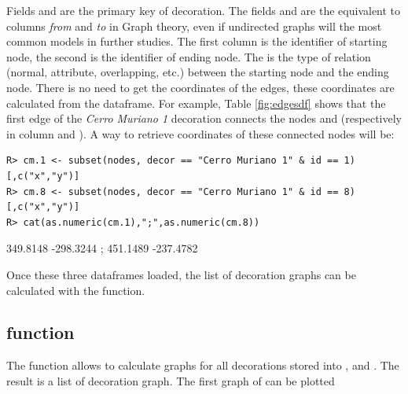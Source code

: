 \documentclass[article]{jss}\usepackage{knitr}
\begin{document}
Fields  and  are the primary key of decoration. The fields  and  are the equivalent to columns \emph{from} and \emph{to} in Graph theory, even if undirected graphs will the most common models in further studies. The first column is the identifier of starting node, the second is the identifier of ending node. The  is the type of relation (normal, attribute, overlapping, etc.) between the starting node and the ending node. There is no need to get the coordinates of the edges, these coordinates are calculated from the  dataframe. For example, Table \ref{fig:edgesdf} shows that the first edge of the \emph{Cerro Muriano 1} decoration connects the nodes  and  (respectively in column  and ). A way to retrieve coordinates of these connected nodes will be:

\begin{kframe}
\begin{verbatim}
R> cm.1 <- subset(nodes, decor == "Cerro Muriano 1" & id == 1)[,c("x","y")]
R> cm.8 <- subset(nodes, decor == "Cerro Muriano 1" & id == 8)[,c("x","y")]
R> cat(as.numeric(cm.1),";",as.numeric(cm.8))
\end{verbatim}
\end{kframe}349.8148 -298.3244 ; 451.1489 -237.4782

Once these three dataframes loaded, the list of decoration graphs can be calculated with the  function.

\subsection{ function} \label{sec:funlistdec}

The  function allows to calculate graphs for all decorations stored into ,  and . The result is a list of decoration graph. The first graph of can be plotted
\end{document}
